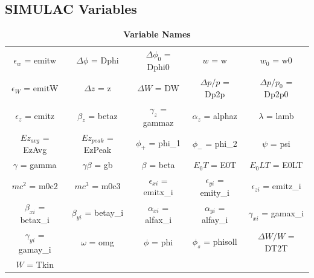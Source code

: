 \documentclass{article}
\begin{document}
\subsection{SIMULAC Variables}
\begin{table}[h]
\caption{\textbf{Variable Names}}
\centering
\begin{tabular}{ c c c c c }
\hline\hline
$\epsilon_{w}$ = emitw   &$\Delta\phi$ = Dphi      &$\Delta\phi_{0}$ = Dphi0   &$w$ = w                    &$w_{0}$ = w0 \\
$\epsilon_{W}$ = emitW   &$\Delta z$ = z           &$\Delta W$ = DW            &$\Delta p/p$ = Dp2p        &$\Delta p/p_0$ = Dp2p0 \\
$\epsilon_{z}$ = emitz   &$\beta_{z}$ = betaz      &$\gamma_z$ = gammaz        &$\alpha_z$ = alphaz        &$\lambda$ = lamb \\
$Ez_{avg}$ = EzAvg       &$Ez_{peak}$ = EzPeak     &$\phi_{+}$ = phi\_1        &$\phi_{-}$ = phi\_2        &$\psi$ = psi \\
$\gamma$ = gamma         &$\gamma\beta$ = gb       &$\beta$ = beta             &$E_0T$ = E0T               & $E_0LT$ = E0LT \\
$mc^2$ = m0c2            &$mc^3$ = m0c3            &$\epsilon_{xi}$ = emitx\_i &$\epsilon_{yi}$ = emity\_i &$\epsilon_{zi}$ = emitz\_i \\
$\beta_{xi}$ = betax\_i  &$\beta_{yi}$ = betay\_i  &$\alpha_{xi}$ = alfax\_i   &$\alpha_{yi}$ = alfay\_i   &$\gamma_{xi}$ = gamax\_i \\  
$\gamma_{yi}$ = gamay\_i &$\omega$ = omg           &$\phi$ = phi               &$\phi_{s}$ = phisoll       &$\Delta W/W$  = DT2T \\
$W$ = Tkin
\end{tabular}
\end{table}
\end{document}
